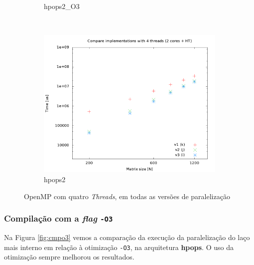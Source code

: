 \documentclass[a4paper, 12pt]{article}
\begin{document}
\begin{figure}[H]
\begin{subfigure}[H]{0.5\textwidth}
        \caption{hpops2\_O3}
        \label{fig:hpops2_O3_cmp_4t}
    \end{subfigure}
    ~ %
    \begin{subfigure}[H]{0.5\textwidth}
        \includegraphics[width=\textwidth]{hpops2_cmp_versions-4t}
        \caption{hpops2}
        \label{fig:hpops2_cmp_4t}
    \end{subfigure}%
    \caption{OpenMP com quatro \textit{Threads}, em todas as versões de paralelização}\label{fig:animals}
\end{figure}

\newpage
\subsubsection{Compilação com a \textit{flag} \texttt{-O3}}

Na Figura \ref{fig:cmpo3} vemos a comparação da execução da paralelização do 
laço mais interno em relação à otimização \texttt{-O3}, na arquitetura
\textbf{hpops}. O uso da otimização sempre melhorou os resultados.
\end{document}
